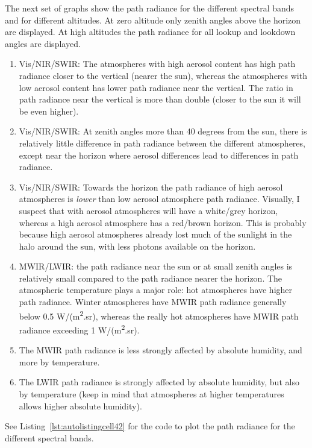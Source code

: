 \documentclass{workpackage}
\begin{document}
The next set of graphs show the path radiance for the different spectral bands and for different altitudes. At zero altitude only zenith angles above the horizon are displayed.  At high altitudes the path radiance for all lookup and lookdown angles are displayed.


\begin{enumerate}
\item Vis/NIR/SWIR:  The atmospheres with high aerosol content has high  path radiance closer to the vertical (nearer the sun), whereas the atmospheres with low aerosol content has lower path radiance near the vertical.  The ratio in path radiance near the vertical is more than double (closer to the sun it will be even higher).
\item Vis/NIR/SWIR: At  zenith angles more than 40 degrees from the sun, there is relatively little difference in path radiance between the different atmospheres, except near the horizon where aerosol differences lead to differences in path radiance.
\item Vis/NIR/SWIR: Towards the horizon the path radiance of high aerosol atmospheres is \textit{lower} than low aerosol atmosphere path radiance. Visually, I suspect that with aerosol atmospheres will have a white/grey horizon, whereas a high aerosol atmosphere has a red/brown horizon.  This is probably because high aerosol atmospheres already lost much of the sunlight in the halo around the sun, with less photons available on the horizon.
\item MWIR/LWIR: the path radiance near the sun or at small zenith angles is relatively small compared to the  path radiance nearer the horizon.  The atmospheric temperature plays a major role: hot atmospheres have higher path radiance.  Winter atmospheres have MWIR path radiance generally below 0.5 W/(m\textsuperscript{2}.sr), whereas the really hot atmospheres have MWIR path radiance exceeding 1 W/(m\textsuperscript{2}.sr).
\item The MWIR path radiance is less strongly affected by absolute humidity, and more by temperature.
\item The LWIR path radiance is strongly affected by absolute humidity, but also by temperature (keep in mind that atmospheres at higher temperatures allows higher absolute humidity).
\end{enumerate}



See Listing~\ref{lst:autolistingcell42} for the code to plot the path radiance for the different spectral bands.
\end{document}
